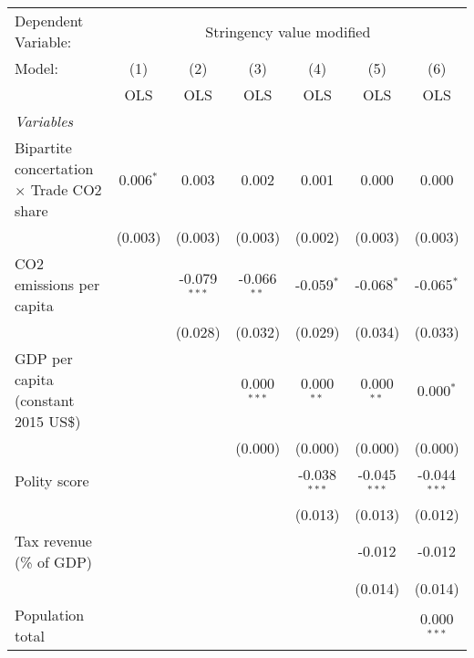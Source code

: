 
\begingroup
\centering
\begin{tabular}{lcccccc}
   \toprule
   Dependent Variable: & \multicolumn{6}{c}{Stringency value modified}\\
   Model:                                           & (1)         & (2)            & (3)           & (4)            & (5)            & (6)\\  
                                                    &  OLS        & OLS            & OLS           & OLS            & OLS            & OLS\\  
   \midrule
   \emph{Variables}\\
   Bipartite concertation $\times$ Trade CO2 share  & 0.006$^{*}$ & 0.003          & 0.002         & 0.001          & 0.000          & 0.000\\   
                                                    & (0.003)     & (0.003)        & (0.003)       & (0.002)        & (0.003)        & (0.003)\\   
   CO2 emissions per capita                         &             & -0.079$^{***}$ & -0.066$^{**}$ & -0.059$^{*}$   & -0.068$^{*}$   & -0.065$^{*}$\\   
                                                    &             & (0.028)        & (0.032)       & (0.029)        & (0.034)        & (0.033)\\   
   GDP per capita (constant 2015 US\$)              &             &                & 0.000$^{***}$ & 0.000$^{**}$   & 0.000$^{**}$   & 0.000$^{*}$\\   
                                                    &             &                & (0.000)       & (0.000)        & (0.000)        & (0.000)\\   
   Polity score                                     &             &                &               & -0.038$^{***}$ & -0.045$^{***}$ & -0.044$^{***}$\\   
                                                    &             &                &               & (0.013)        & (0.013)        & (0.012)\\   
   Tax revenue (\% of GDP)                          &             &                &               &                & -0.012         & -0.012\\   
                                                    &             &                &               &                & (0.014)        & (0.014)\\   
   Population total                                 &             &                &               &                &                & 0.000$^{***}$\\   

\end{tabular}
